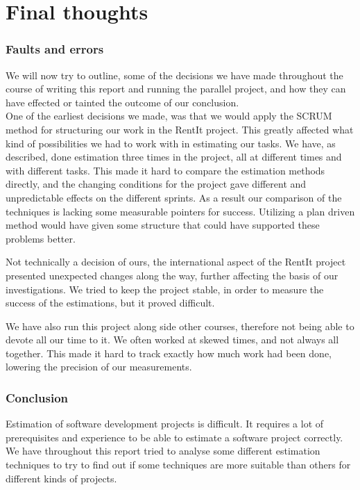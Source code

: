 \part{Final thoughts}
\section{Faults and errors}
We will now try to outline, some of the decisions we have made throughout the course of writing this report and running the parallel project, and how they can have effected or tainted the outcome of our conclusion.\\

One of the earliest decisions we made, was that we would apply the SCRUM method for structuring our work in the RentIt project. This greatly affected what kind of possibilities we had to work with in estimating our tasks. We have, as described, done estimation three times in the project, all at different times and with different tasks. This made it hard to compare the estimation methods directly, and the changing conditions for the project gave different and unpredictable effects on the different sprints. As a result our comparison of the techniques is lacking some measurable pointers for success. Utilizing a plan driven method would have given some structure that could have supported these problems better.

Not technically a decision of ours, the international aspect of the RentIt project presented unexpected changes along the way, further affecting the basis of our investigations. We tried to keep the project stable, in order to measure the success of the estimations, but it proved difficult.

We have also run this project along side other courses, therefore not being able to devote all our time to it. We often worked at skewed times, and not always all together. This made it hard to track exactly how much work had been done, lowering the precision of our measurements.

\section{Conclusion}
Estimation of software development projects is difficult. It requires a lot of prerequisites and experience to
be able to estimate a software project correctly. We have throughout this report tried to analyse some different
estimation techniques to try to find out if some techniques are more suitable than others for different kinds of
projects.\\

